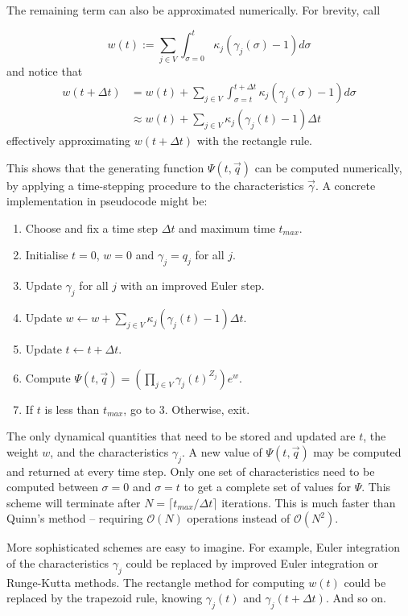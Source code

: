 \documentclass{article}
\begin{document}
The remaining term can also be approximated numerically. For brevity, call

\begin{equation}
    w(t) := {\sum_{j \in V} \int_{\sigma=0}^{t} \kappa_j (\gamma_j(\sigma)-1) d\sigma}
\end{equation}
and notice that
\begin{align}
    w(t + \Delta t)
    &= w(t) +
    \sum_{j \in V} \int_{\sigma=t}^{t + \Delta t} \kappa_j (\gamma_j(\sigma)-1) d\sigma
    \nonumber \\
    &\approx  w(t) + \sum_{j \in V} \kappa_j (\gamma_j(t)-1) \Delta t
\end{align}
effectively approximating $w(t+\Delta t)$ with the rectangle rule.

This shows that the generating function $\Psi(t, \vec{q})$ can be computed
numerically, by applying a time-stepping procedure to the characteristics
$\vec{\gamma}$. A concrete implementation in pseudocode might be:

\begin{enumerate}
    \item Choose and fix a time step $\Delta t$ and maximum time $t_{max}$.
    \item Initialise $t = 0$, $w = 0$ and $\gamma_j = q_j$ for all $j$.
    \item Update $\gamma_j$ for all $j$ with an improved Euler step.
    \item Update $w \leftarrow w + \sum_{j \in V} \kappa_j (\gamma_j(t)-1)
    \Delta t$.
    \item Update $t \leftarrow t + \Delta t$.
    \item Compute $\Psi(t, \vec{q}) = \left(\prod_{j \in V}
    \gamma_j(t)^{Z_j}\right) e^w$.
    \item If $t$ is less than $t_{max}$, go to 3. Otherwise, exit.
\end{enumerate}

The only dynamical quantities that need to be stored and updated are $t$, the
weight $w$, and the
characteristics $\gamma_j$. A new value of $\Psi(t, \vec{q})$ may be computed
and returned at every time step. Only one set of characteristics need to be computed
between $\sigma = 0$ and $\sigma = t$ to get a complete set of values for
$\Psi$. This scheme will terminate after $N = \lceil t_{max} / \Delta t \rceil$
iterations. This is much faster than Quinn's method -- requiring
$\mathcal{O}(N)$ operations instead of $\mathcal{O}(N^2)$.

More sophisticated schemes are easy to imagine. For example, Euler integration
of the characteristics $\gamma_j$ could be replaced by improved Euler
integration or Runge-Kutta methods. The rectangle method for computing $w(t)$
could be replaced by the trapezoid rule, knowing $\gamma_j(t)$ and $\gamma_j(t +
\Delta t)$. And so on.
\end{document}
